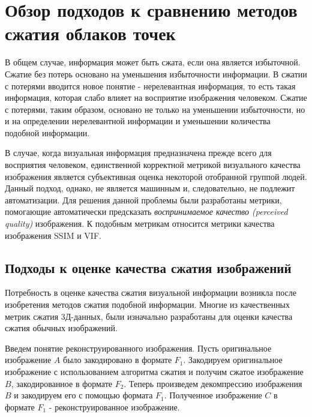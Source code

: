\newpage
\chapter{Обзор подходов к сравнению методов сжатия облаков точек}


В общем случае, информация может быть сжата, если она является избыточной.
Сжатие без потерь основано на уменьшения избыточности информации. В сжатии с
потерями вводится новое понятие - нерелевантная информация, то есть такая
информация, которая слабо влияет на восприятие изображения человеком. Сжатие с
потерями, таким образом, основано не только на уменьшении избыточности, но и на
определении нерелевантной информации и уменьшении количества подобной
информации\cite[265]{DataCompression}.

В случае, когда визуальная информация предназначена прежде всего для восприятия
человеком, единственной корректной метрикой визуального качества изображения
является субъективная оценка некоторой отобранной группой
людей\cite{SSIMArticle}. Данный подход, однако, не является машинным и,
следовательно, не подлежит автоматизации. Для решения данной проблемы были
разработаны метрики, помогающие автоматически предсказать \textit{воспринимаемое
качество (perceived quality)} изображения. К подобным метрикам относится метрики
качества изображения SSIM и VIF.

\section{Подходы к оценке качества сжатия изображений}


Потребность в оценке качества сжатия визуальной информации возникла после
изобретения методов сжатия подобной информации. Многие из качественных метрик
сжатия 3Д-данных, были изначально разработаны для оценки качества сжатия обычных
изображений.

Введем понятие реконструированного изображения. Пусть оригинальное изображение
$A$ было закодировано в формате $F_{1}$. Закодируем оригинальное изображение с
использованием алгоритма сжатия и получим сжатое изображение $B$, закодированное
в формате $F_{2}$. Теперь произведем декомпрессию изображения $B$ и закодируем
его с помощью формата $F_{1}$. Полученное изображение $C$ в формате $F_{1}$ -
реконструированное изображение.


